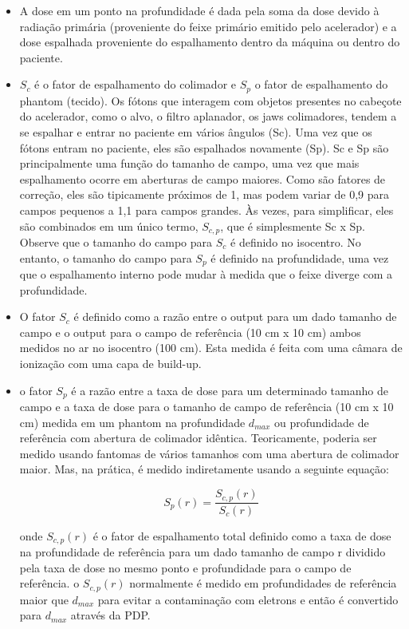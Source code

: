 \documentclass[11pt,a4paper]{article}
\newcounter{exemplo}
\begin{document}
\begin{exemplo}
\begin{itemize}
        \item A dose em um ponto na profundidade é dada pela soma da dose devido à radiação primária (proveniente do feixe primário emitido pelo acelerador) e a dose espalhada proveniente do espalhamento dentro da máquina ou dentro do paciente.
        
        \item $S_c$ é o fator de espalhamento do colimador e $S_p$ o fator de espalhamento do phantom (tecido). Os fótons que interagem com objetos presentes no cabeçote do acelerador, como o alvo, o filtro aplanador, os jaws colimadores, tendem a se espalhar e entrar no paciente em vários ângulos (Sc). Uma vez que os fótons entram no paciente, eles são espalhados novamente (Sp). Sc e Sp são principalmente uma função do tamanho de campo, uma vez que mais espalhamento ocorre em aberturas de campo maiores. Como são fatores de correção, eles são tipicamente próximos de 1, mas podem variar de 0,9 para campos pequenos a 1,1 para campos grandes. Às vezes, para simplificar, eles são combinados em um único termo, $S_{c,p}$, que é simplesmente Sc x Sp. Observe que o tamanho do campo para $S_c$ é definido no isocentro. No entanto, o tamanho do campo para $S_{p}$ é definido na profundidade, uma vez que o espalhamento interno pode mudar à medida que o feixe diverge com a profundidade.
        
        \item O fator $S_c$ é definido como a razão entre o output para um dado tamanho de campo e o output para o campo de referência (10 cm x 10 cm) ambos medidos no ar no isocentro (100 cm). Esta medida é feita com uma câmara de ionização com uma capa de build-up.
        
        \item o fator $S_p$ é a razão entre a taxa de dose para um determinado tamanho de campo e a taxa de dose  para o tamanho de campo de referência (10 cm x 10 cm) medida em um phantom na profundidade $d_{max}$ ou profundidade de referência com abertura de colimador idêntica. Teoricamente, poderia ser medido usando fantomas de vários tamanhos com uma abertura de colimador maior. Mas, na prática, é medido indiretamente usando a seguinte equação:
        
            $$S_p(r) = \frac{S_{c,p}(r)}{S_c(r)}$$

        onde $S_{c,p}(r)$ é o fator de espalhamento total definido como a taxa de dose na profundidade de referência para um dado tamanho de campo r dividido pela taxa de dose no mesmo ponto e profundidade para o campo de referência. o $S_{c,p}(r)$ normalmente é medido em profundidades de referência maior que $d_{max}$ para evitar a contaminação com eletrons e então é convertido para $d_{max}$ através da PDP.


\end{itemize}
\end{exemplo}
\end{document}
